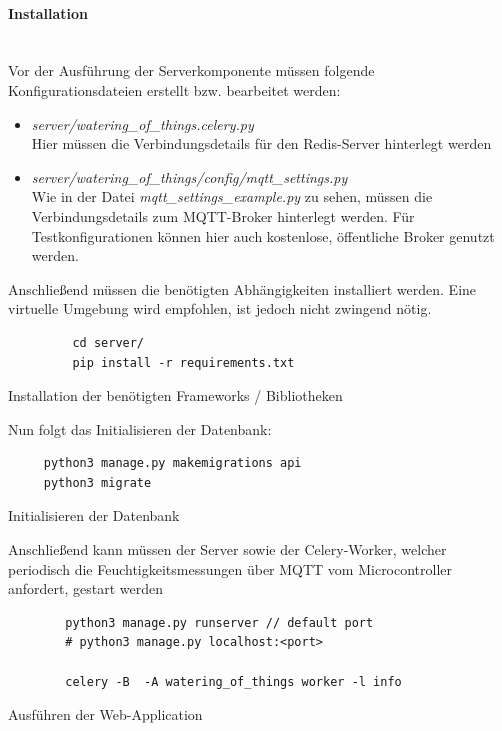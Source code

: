         \paragraph*{Installation}\mbox{}\\
        Vor der Ausführung der Serverkomponente müssen folgende Konfigurationsdateien erstellt bzw. bearbeitet werden:
        \begin{itemize}
            \item \textit{server/watering\_of\_things.celery.py}\\
            Hier müssen die Verbindungsdetails für den Redis-Server hinterlegt werden
            \item \textit{server/watering\_of\_things/config/mqtt\_settings.py}\\
            Wie in der Datei \textit{mqtt\_settings\_example.py} zu sehen, müssen die Verbindungsdetails zum MQTT-Broker hinterlegt werden. Für Testkonfigurationen können hier auch kostenlose, öffentliche Broker genutzt werden.
        \end{itemize}
     Anschließend müssen die benötigten Abhängigkeiten installiert werden. Eine virtuelle Umgebung wird empfohlen, ist jedoch nicht zwingend nötig.
     \begin{listing}[H]
         \begin{verbatim}
         cd server/
         pip install -r requirements.txt
         \end{verbatim}
         \caption{Installation der benötigten Frameworks / Bibliotheken}
     \end{listing}
     
     Nun folgt das Initialisieren der Datenbank:
     \begin{listing}[H]
     \begin{verbatim}
     python3 manage.py makemigrations api
     python3 migrate
     \end{verbatim}
     \caption{Initialisieren der Datenbank}
      \end{listing}

 
     Anschließend kann müssen der Server sowie der Celery-Worker, welcher periodisch die Feuchtigkeitsmessungen über MQTT vom Microcontroller anfordert,  gestart werden
    
    \begin{listing}[H]
        \begin{verbatim}
        python3 manage.py runserver // default port
        # python3 manage.py localhost:<port>
                
        celery -B  -A watering_of_things worker -l info
        \end{verbatim}
        \caption{Ausführen der Web-Application}
    \end{listing}
    
